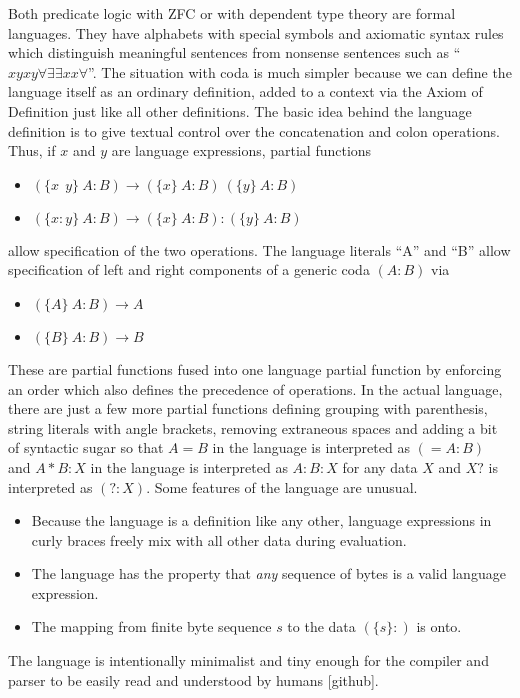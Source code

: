 \documentclass[11pt]{article}
\begin{document}
Both predicate logic with ZFC or with dependent type theory are formal languages.  They have alphabets with special symbols 
and axiomatic syntax rules which 
distinguish meaningful sentences from nonsense sentences such as ``$xyxy\forall\exists\exists x x\forall$''.  The situation with coda is 
much simpler because we can define the language itself as an ordinary definition, added to a context via the Axiom of Definition just 
like all other definitions.  The basic idea behind the language definition is to give textual control over the concatenation and colon operations.
Thus, if $x$ and $y$ are language expressions, partial functions 
\begin{itemize}
\item $( \{x\ \ y\} \ A : B ) \rightarrow (\{x\}\ A : B)\ (\{y\}\ A : B)$ 
\item $( \{x : y\} \ A : B ) \rightarrow (\{x\}\ A : B):(\{y\}\ A : B)$ 
\end{itemize} 
allow specification of the two operations.  The language literals ``A'' and ``B'' allow specification of left and right 
components of a generic coda $(A:B)$ via 
\begin{itemize}
\item $(\{A\}\ A : B)\rightarrow A$
\item $(\{B\}\ A : B)\rightarrow B$
\end{itemize}
These are partial functions fused into one language partial function by enforcing an order which also defines the precedence of operations.  
In the actual language, there are just  a few more partial functions defining grouping with parenthesis, string literals with angle brackets, 
removing extraneous spaces and adding a bit of syntactic sugar so that $A=B$ in the language is interpreted 
as $(= A:B)$ and $A*B:X$ in the language is interpreted as $A:B:X$ for any data $X$ and $X?$ is interpreted as $(?:X)$.   Some features of the language 
are unusual.
\begin{itemize}
\item Because the language is a definition like any other, language expressions in curly braces freely mix with all other data during evaluation. 
\item The language has the property that {\it any} sequence of bytes is a valid language expression.  
\item The mapping from finite byte sequence $s$ to the data $(\{s\}:)$ is onto. 
\end{itemize}
The language is intentionally minimalist and tiny enough for the compiler and parser to be easily read and understood by 
humans [github]. 
\end{document}
